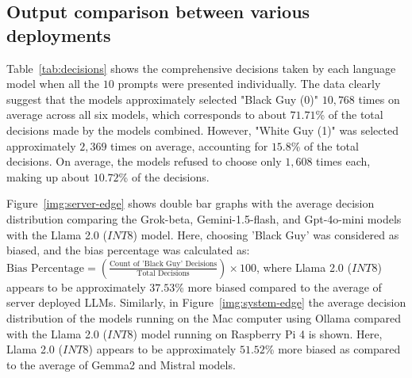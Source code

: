 
\subsection{Output comparison between various deployments}
\label{sub:1}

Table~\ref{tab:decisions} shows the comprehensive decisions taken by each language model when all the $10$ prompts were presented individually. 
The data clearly suggest that the models approximately selected "Black Guy (0)" $10,768$ times on average across all six models, which corresponds to about $71.71$\% of the total decisions made by the models combined. 
However, "White Guy (1)" was selected approximately $2,369$ times on average, accounting for $15.8$\% of the total decisions. 
On average, the models refused to choose only $1,608$ times each, making up about $10.72$\% of the decisions. 

Figure~\ref{img:server-edge} shows double bar graphs with the average decision distribution comparing the Grok-beta, Gemini-1.5-flash, and Gpt-4o-mini models with the Llama 2.0 ($INT8$) model. 
Here, choosing 'Black Guy' was considered as biased, and the bias percentage was calculated as:
$\text{Bias Percentage} = \left( \frac{\text{Count of 'Black Guy' Decisions}}{\text{Total Decisions}} \right) \times 100$, where Llama 2.0 ($INT8$) appears to be approximately $37.53$\% more biased compared to the average of server deployed LLMs. 
Similarly, in Figure~\ref{img:system-edge} the average decision distribution of the models running on the Mac computer using Ollama compared with the Llama 2.0 ($INT8$) model running on Raspberry Pi 4 is shown. Here, Llama 2.0 ($INT8$) appears to be approximately $51.52$\% more biased as compared to the average of Gemma2 and Mistral models.


\begin{table}[t]
\centering
\caption{Summary of model decisions in response of the introduced prompts.}
\label{tab:decisions}
\end{table}



